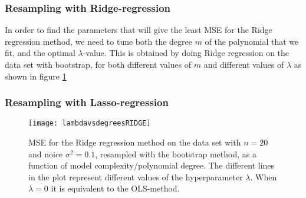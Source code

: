 \subsubsection{Resampling with Ridge-regression}
In order to find the parameters that will give the least MSE for the Ridge regression method, we need to tune both the degree $m$ of the polynomial that we fit, and the optimal $\lambda$-value. This is obtained by doing Ridge regression on the data set with bootstrap, for both different values of $m$ and different values of $\lambda$ as shown in figure \ref{fig:lambdavsdegreesRIDGE}

\subsubsection{Resampling with Lasso-regression}
\begin{figure}[htbp]
	\centering
	\texttt{[image: lambdavsdegreesRIDGE]}
	\caption{MSE for the Ridge regression method on the data set with $n=20$ and noice $\sigma^2=0.1$, resampled with the bootstrap method, as a function of model complexity/polynomial degree. The different lines in the plot represent different values of the hyperparameter $\lambda$. When $\lambda=0$ it is equivalent to the OLS-method.}
	\label{fig:lambdavsdegreesRIDGE}
\end{figure}

\vfill
\newpage
